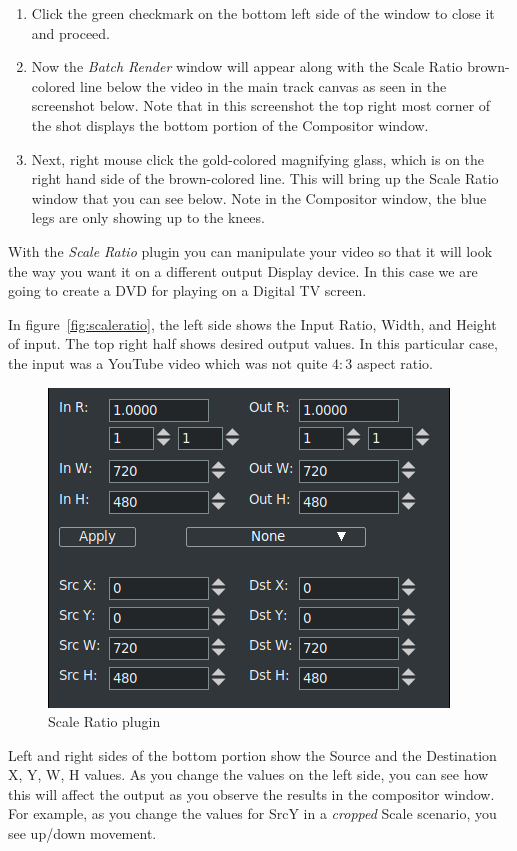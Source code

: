 \begin{enumerate}[start=8]
    \item Click the green checkmark on the bottom left side of the window to close it and proceed.
    \item Now the \textit{Batch Render} window will appear along with the Scale Ratio brown-colored line below the video in the main track canvas as seen in the screenshot below. Note that in this screenshot the top right most corner of the shot displays the bottom portion of the Compositor window.
    \item Next, right mouse click the gold-colored magnifying glass, which is on the right hand side of the brown-colored line. This will bring up the Scale Ratio window that you can see below.  Note in the Compositor window, the blue legs are only showing up to the knees.
\end{enumerate}

With the \textit{Scale Ratio} plugin you can manipulate your video so that it will look the way you want it on a different output Display device.  In this case we are going to create a DVD for playing on a Digital TV screen. 

In figure~\ref{fig:scaleratio}, the left side shows the Input Ratio, Width, and Height of input. The top right half shows desired output values.  In this particular case, the input was a YouTube video which was not quite $4:3$ aspect ratio.

\begin{figure}[htpb]
    \centering
    \includegraphics[width=0.7\linewidth]{images/scaleratio.png}
    \caption{Scale Ratio plugin}
    \label{fig:scaleratio1}
\end{figure}

Left and right sides of the bottom portion show the Source and the Destination X, Y, W, H values.  As you change the values on the left side, you can see how this will affect the output as you observe the results in the compositor window.  For example, as you change the values for SrcY in a \textit{cropped} Scale scenario, you see up/down movement.

